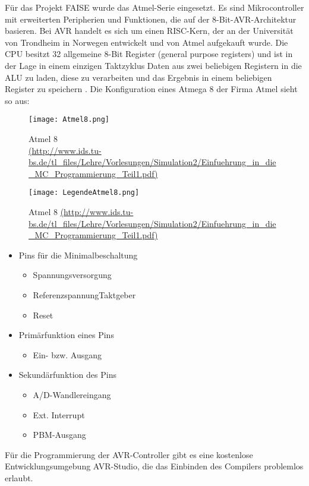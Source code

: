 F\"ur das Projekt FAISE wurde das Atmel-Serie eingesetzt. Es sind Mikrocontroller mit erweiterten Peripherien und Funktionen, 
die auf der 8-Bit-AVR-Architektur basieren. Bei AVR handelt es sich um einen RISC-Kern, der an der Universit\"at von Trondheim 
in Norwegen entwickelt und von Atmel aufgekauft wurde. Die CPU besitzt 32 allgemeine 8-Bit Register (general purpose registers) 
und ist in der Lage in einem einzigen Taktzyklus Daten aus zwei beliebigen Registern in die ALU zu laden, diese zu verarbeiten 
und das Ergebnis in einem beliebigen Register zu speichern \cite[vgl.]{Viktor:Seib:2014:Online}. Die Konfiguration eines Atmega 8 der Firma Atmel sieht so aus:
\begin{figure}[h!]
	\centering
		\texttt{[image: Atmel8.png]}
	\caption{Atmel 8 \\ \url{(http://www.ids.tu-bs.de/tl\_files/Lehre/Vorlesungen/Simulation2/Einfuehrung\_in\_die\_MC\_Programmierung\_Teil1.pdf)}}
	\label{Atmel 8}
\end{figure}
\begin{figure}[h!]
	\centering
		\texttt{[image: LegendeAtmel8.png]}
	\caption{Atmel 8 \url{(http://www.ids.tu-bs.de/tl\_files/Lehre/Vorlesungen/Simulation2/Einfuehrung\_in\_die\_MC\_Programmierung\_Teil1.pdf)}}
	\label{Legende Atmel8}
\end{figure}
\begin{itemize}
\item Pins f\"ur die Minimalbeschaltung
\begin{itemize}
          \item Spannungsversorgung
          \item ReferenzspannungTaktgeber
          \item Reset      
					\end{itemize}
\item Prim\"arfunktion eines Pins
\begin{itemize}
          \item Ein- bzw. Ausgang
					\end{itemize}
\item Sekund\"arfunktion des Pins
\begin{itemize}
          \item A/D-Wandlereingang
          \item Ext. Interrupt
          \item PBM-Ausgang   
\end{itemize}
\end{itemize}
F\"ur die Programmierung der AVR-Controller gibt es eine kostenlose Entwicklungsumgebung AVR-Studio, die das Einbinden des Compilers problemlos erlaubt.

